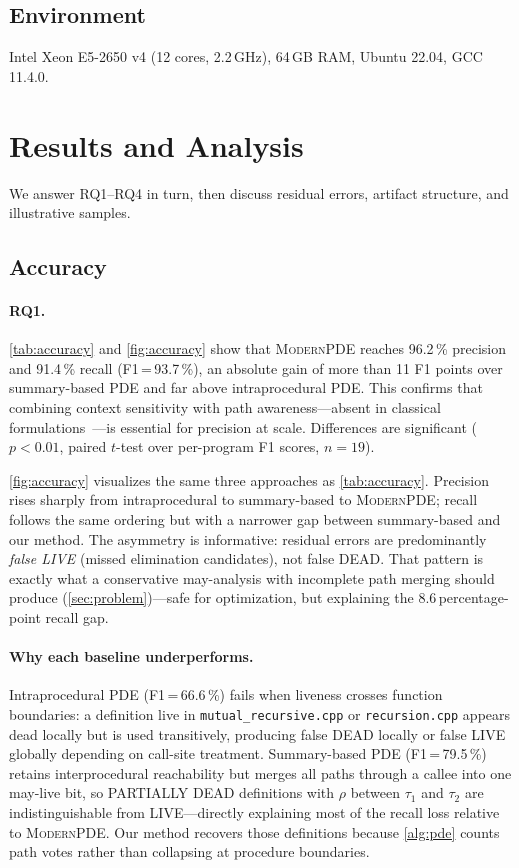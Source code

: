 \documentclass[acmsmall,screen,review,anonymous]{acmart}
\begin{document}
\subsection{Environment}
Intel Xeon E5-2650 v4 (12 cores, 2.2\,GHz), 64\,GB RAM, Ubuntu 22.04, GCC 11.4.0.

\section{Results and Analysis}
\label{sec:results}
We answer RQ1--RQ4 in turn, then discuss residual errors, artifact structure, and illustrative samples.

\subsection{Accuracy}
\paragraph{RQ1.}
\autoref{tab:accuracy} and \autoref{fig:accuracy} show that \textsc{ModernPDE} reaches 96.2\,\% precision and 91.4\,\% recall (F1\,=\,93.7\,\%), an absolute gain of more than 11 F1 points over summary-based PDE and far above intraprocedural PDE. This confirms that combining context sensitivity with path awareness---absent in classical formulations~\cite{knoop1994partial,morel1979global}---is essential for precision at scale. Differences are significant ($p<0.01$, paired $t$-test over per-program F1 scores, $n{=}19$).

\autoref{fig:accuracy} visualizes the same three approaches as \autoref{tab:accuracy}. Precision rises sharply from intraprocedural to summary-based to \textsc{ModernPDE}; recall follows the same ordering but with a narrower gap between summary-based and our method. The asymmetry is informative: residual errors are predominantly \emph{false LIVE} (missed elimination candidates), not false DEAD. That pattern is exactly what a conservative may-analysis with incomplete path merging should produce (\autoref{sec:problem})---safe for optimization, but explaining the 8.6\,percentage-point recall gap.

\paragraph{Why each baseline underperforms.}
Intraprocedural PDE (F1\,=\,66.6\,\%) fails when liveness crosses function boundaries: a definition live in \texttt{mutual\_recursive.cpp} or \texttt{recursion.cpp} appears dead locally but is used transitively, producing false DEAD locally or false LIVE globally depending on call-site treatment. Summary-based PDE (F1\,=\,79.5\,\%) retains interprocedural reachability but merges all paths through a callee into one may-live bit, so PARTIALLY DEAD definitions with $\rho$ between $\tau_1$ and $\tau_2$ are indistinguishable from LIVE---directly explaining most of the recall loss relative to \textsc{ModernPDE}. Our method recovers those definitions because \autoref{alg:pde} counts path votes rather than collapsing at procedure boundaries.
\end{document}
